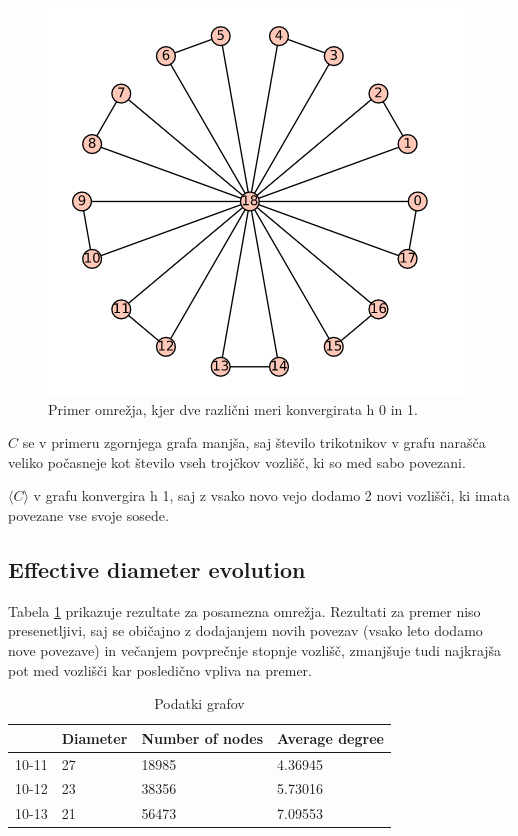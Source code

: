 \documentclass[a4paper,11pt]{article}
\begin{document}
\begin{figure}[htbp]
\begin{center}
\includegraphics[scale=0.7]{clustering_graph.png}
\caption{Primer omrežja, kjer dve različni meri konvergirata h 0 in 1.}
\label{clustering_graph}
\end{center}
\end{figure}

$ C $ se v primeru zgornjega grafa manjša, saj število trikotnikov v grafu narašča veliko počasneje kot število vseh trojčkov vozlišč, ki so med sabo povezani.

$\langle C \rangle$ v grafu konvergira h 1, saj z vsako novo vejo dodamo 2 novi vozlišči, ki imata povezane vse svoje sosede.


\subsection{Effective diameter evolution}

Tabela \ref{tbg} prikazuje rezultate za posamezna omrežja. Rezultati za premer niso presenetljivi, saj se običajno z dodajanjem novih povezav (vsako leto dodamo nove povezave) in večanjem povprečnje stopnje vozlišč, zmanjšuje tudi najkrajša pot med vozlišči kar posledično vpliva na premer. 

\begin{table}[]
\centering
\caption{Podatki grafov}
\label{tbg}
\begin{tabular}{|l|l|l|l|}
\hline
 & Diameter & Number of nodes  & Average degree \\ \hline
10-11 & 27 & 18985 & 4.36945 \\ \hline
10-12 & 23 & 38356 & 5.73016 \\ \hline
10-13 & 21 & 56473 & 7.09553 \\ \hline
\end{tabular}
\end{table}
\end{document}
